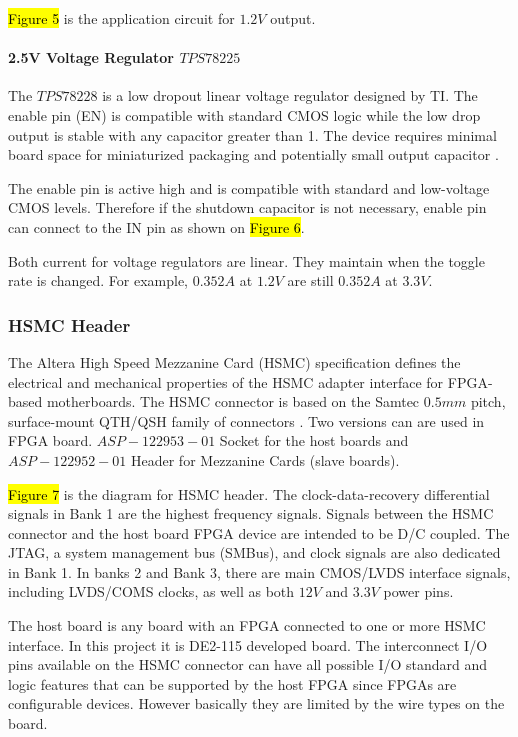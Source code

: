\hl{Figure 5} is the application circuit for $1.2V$ output.


\paragraph{2.5V Voltage Regulator \texorpdfstring{$TPS78225$}{TPS78225}}
The $TPS78228$ is a low dropout linear voltage regulator designed by TI. The enable pin (EN) is compatible with standard CMOS logic while the low drop output is stable with any capacitor greater than 1. The device requires minimal board space for miniaturized packaging and potentially small output capacitor \citep{TI:2008:TPS782}.

The enable pin is active high and is compatible with standard and low-voltage CMOS levels. Therefore if the shutdown capacitor is not necessary, enable pin can connect to the IN pin as shown on \hl{Figure 6}.

Both current for voltage regulators are linear. They maintain when the toggle rate is changed. For example, $0.352A$ at $1.2V$ are still $0.352A$ at $3.3V$.


\subsubsection{HSMC Header}

The Altera High Speed Mezzanine Card (HSMC) specification defines the electrical and mechanical properties of the HSMC adapter interface for FPGA-based motherboards. The HSMC connector is based on the Samtec $0.5mm$ pitch, surface-mount QTH/QSH family of connectors \citep{Altera:2009:HSMCspec}. Two versions can are used in FPGA board. $ASP-122953-01$ Socket for the host boards and $ASP-122952-01$ Header for Mezzanine Cards (slave boards).

\hl{Figure 7} is the diagram for HSMC header. The clock-data-recovery differential signals in Bank 1 are the highest frequency signals. Signals between the HSMC connector and the host board FPGA device are intended to be D/C coupled. The JTAG, a system management bus (SMBus), and clock signals are also dedicated in Bank 1. In banks 2 and Bank 3, there are main CMOS/LVDS interface signals, including LVDS/COMS clocks, as well as both $12V$ and $3.3V$ power pins.

The host board is any board with an FPGA connected to one or more HSMC interface. In this project it is DE2-115 developed board. The interconnect I/O pins available on the HSMC connector can have all possible I/O standard and logic features that can be supported by the host FPGA since FPGAs are configurable devices. However basically they are limited by the wire types on the board.


